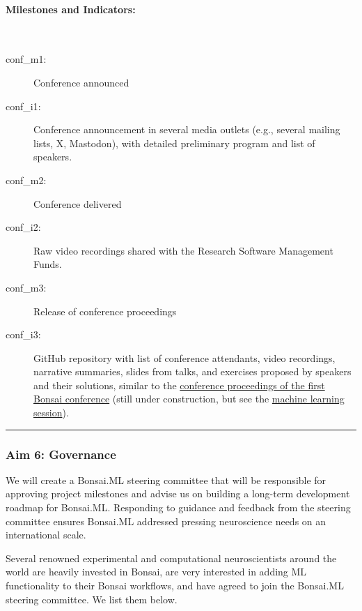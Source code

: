 \paragraph{Milestones and Indicators:}\mbox{}\\

\begin{description}

    \item[conf\_m1:] Conference announced

    \item[conf\_i1:] Conference announcement in several media outlets (e.g.,
        several mailing lists, X, Mastodon), with detailed preliminary program
        and list of speakers.

    \item[conf\_m2:] Conference delivered

    \item[conf\_i2:] Raw video recordings shared with the Research Software
        Management Funds.

    \item[conf\_m3:] Release of conference proceedings

    \item[conf\_i3:] GitHub repository with list of conference attendants,
        video recordings, narrative summaries, slides from talks, and exercises
        proposed by speakers and their solutions, similar to the
        \href{https://github.com/joacorapela/bonsaiConference2024Proceedings}{conference
        proceedings of the first Bonsai conference} (still under construction,
        but see the
        \href{https://github.com/joacorapela/bonsaiConference2024Proceedings/blob/master/sessions/machineLearning/README.md}{machine
        learning session}).
\end{description}

\noindent\rule{\textwidth}{1pt}
\subsubsection{Aim 6: Governance}

We will create a Bonsai.ML steering committee that will be responsible for
approving project milestones and advise us on building a long-term development
roadmap for Bonsai.ML.
%
Responding to guidance and feedback from the steering committee ensures
Bonsai.ML addressed pressing neuroscience needs on an international scale.

Several renowned experimental and computational neuroscientists around the
world are heavily invested in Bonsai, are very interested in adding ML
functionality to their Bonsai workflows, and have agreed to join the Bonsai.ML
steering committee. We list them below.


